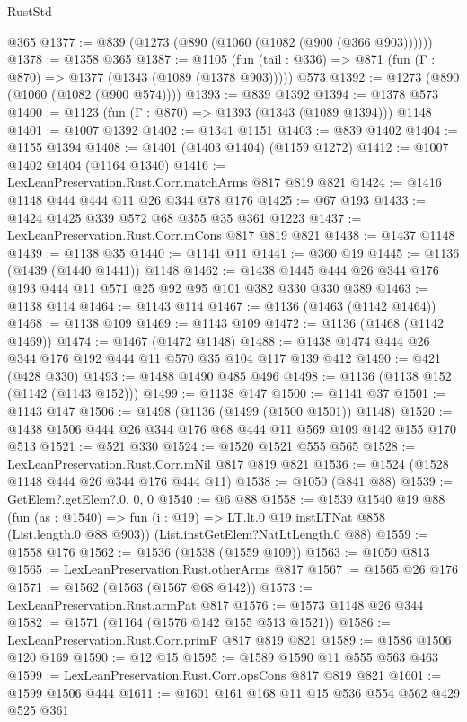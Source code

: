\begin{lexlean}{RustStd}
\begin{coremodule}
{\begin{coremodule}
{{{{{{{{    @365
@1377 := @839 (@1273 (@890 (@1060 (@1082 (@900 (@366 @903))))))
@1378 := @1358 @365
@1387 := @1105
    (fun (tail : @336) => @871 (fun (Γ : @870) => @1377 (@1343 (@1089 (@1378 @903)))))
    @573
@1392 := @1273 (@890 (@1060 (@1082 (@900 @574))))
@1393 := @839 @1392
@1394 := @1378 @573
@1400 := @1123 (fun (Γ : @870) => @1393 (@1343 (@1089 @1394))) @1148
@1401 := @1007 @1392
@1402 := @1341 @1151
@1403 := @839 @1402
@1404 := @1155 @1394
@1408 := @1401 (@1403 @1404) (@1159 @1272)
@1412 := @1007 @1402 @1404 (@1164 @1340)
@1416 := LexLeanPreservation.Rust.Corr.matchArms @817 @819 @821
@1424 := @1416 @1148 @444 @444 @11 @26 @344 @78 @176
@1425 := @67 @193
@1433 := @1424 @1425 @339 @572 @68 @355 @35 @361 @1223
@1437 := LexLeanPreservation.Rust.Corr.mCons @817 @819 @821
@1438 := @1437 @1148
@1439 := @1138 @35
@1440 := @1141 @11
@1441 := @360 @19
@1445 := @1136 (@1439 (@1440 @1441)) @1148
@1462 := @1438 @1445 @444 @26 @344 @176 @193 @444 @11 @571 @25 @92 @95 @101 @382 @330 @330 @389
@1463 := @1138 @114
@1464 := @1143 @114
@1467 := @1136 (@1463 (@1142 @1464))
@1468 := @1138 @109
@1469 := @1143 @109
@1472 := @1136 (@1468 (@1142 @1469))
@1474 := @1467 (@1472 @1148)
@1488 := @1438 @1474 @444 @26 @344 @176 @192 @444 @11 @570 @35 @104 @117 @139 @412
@1490 := @421 (@428 @330)
@1493 := @1488 @1490 @485 @496
@1498 := @1136 (@1138 @152 (@1142 (@1143 @152)))
@1499 := @1138 @147
@1500 := @1141 @37
@1501 := @1143 @147
@1506 := @1498 (@1136 (@1499 (@1500 @1501)) @1148)
@1520 := @1438 @1506 @444 @26 @344 @176 @68 @444 @11 @569 @109 @142 @155 @170 @513
@1521 := @521 @330
@1524 := @1520 @1521 @555 @565
@1528 := LexLeanPreservation.Rust.Corr.mNil @817 @819 @821
@1536 := @1524 (@1528 @1148 @444 @26 @344 @176 @444 @11)
@1538 := @1050 (@841 @88)
@1539 := GetElem?.getElem?.{0, 0, 0}
@1540 := @6 @88
@1558 := @1539
    @1540
    @19
    @88
    (fun (as : @1540) => fun (i : @19) => LT.lt.{0} @19 instLTNat @858 (List.length.{0} @88 @903))
    (List.instGetElem?NatLtLength.{0} @88)
@1559 := @1558 @176
@1562 := @1536 (@1538 (@1559 @109))
@1563 := @1050 @813
@1565 := LexLeanPreservation.Rust.otherArms @817
@1567 := @1565 @26 @176
@1571 := @1562 (@1563 (@1567 @68 @142))
@1573 := LexLeanPreservation.Rust.armPat @817
@1576 := @1573 @1148 @26 @344
@1582 := @1571 (@1164 (@1576 @142 @155 @513 @1521))
@1586 := LexLeanPreservation.Rust.Corr.primF @817 @819 @821
@1589 := @1586 @1506 @120 @169
@1590 := @12 @15
@1595 := @1589 @1590 @11 @555 @563 @463
@1599 := LexLeanPreservation.Rust.Corr.opsCons @817 @819 @821
@1601 := @1599 @1506 @444
@1611 := @1601 @161 @168 @11 @15 @536 @554 @562 @429 @525 @361
}}}}}}}}
\end{coremodule}}
\end{coremodule}
\end{lexlean}
